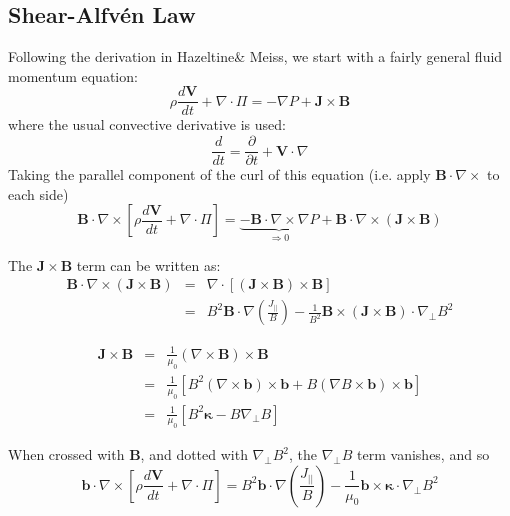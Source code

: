 \documentclass[12pt, a4paper]{article}
\newcommand{\deriv}[2]{\ensuremath{\frac{\partial #1}{\partial #2}}}
\newcommand{\Vec}[1]{\ensuremath{\mathbf{#1}}}
\newcommand{\Bvec}{\Vec{B}}
\newcommand{\Jvec}{\Vec{J}}
\newcommand{\Div}[1]{\ensuremath{\nabla\cdot #1 }}
\begin{document}
\subsection{Shear-Alfv\'en Law}

Following the derivation in Hazeltine\& Meiss, we start with a fairly general fluid momentum equation:
\begin{equation}
\rho\frac{d\Vec{V}}{dt} + \Div{\Pi} = -\nabla P + \Jvec\times\Bvec
\label{eq:genfluid}
\end{equation}
where the usual convective derivative is used:
\[
\frac{d}{dt} = \deriv{}{t} + \Vec{V}\cdot\nabla
\]
Taking the parallel component of the curl of this equation (i.e. apply $\Bvec\cdot\nabla\times$ to each side)
\[
\Bvec\cdot\nabla\times\left[\rho\frac{d\Vec{V}}{dt} + \Div{\Pi}\right] = \underbrace{-\Bvec\cdot\nabla\times\nabla P}_{\Rightarrow 0} + \Bvec\cdot\nabla\times\left(\Jvec\times\Bvec\right)
\]

The $\Jvec\times\Bvec$ term can be written as:
\begin{eqnarray}
\Bvec\cdot\nabla\times\left(\Jvec\times\Bvec\right) &=& \nabla\cdot\left[\left(\Jvec\times\Bvec\right)\times\Bvec\right] \nonumber \\
&=& B^2\Bvec\cdot\nabla\left(\frac{J_{||}}{B}\right) - \frac{1}{B^2}\Bvec\times\left(\Jvec\times\Bvec\right)\cdot\nabla_\perp B^2
\end{eqnarray}

\begin{eqnarray}
\Jvec\times\Bvec &=& \frac{1}{\mu_0}\left(\nabla\times\Bvec\right)\times\Bvec \nonumber \\
&=& \frac{1}{\mu_0}\left[B^2\left(\nabla\times\Vec{b}\right)\times\Vec{b} + B\left(\nabla B\times\Vec{b}\right)\times\Vec{b}\right] \nonumber \\
&=& \frac{1}{\mu_0}\left[B^2\Vec{\kappa} - B\nabla_\perp B\right]
\end{eqnarray}

When crossed with $\Bvec$, and dotted with $\nabla_\perp B^2$, the $\nabla_\perp B$ term vanishes, and so
\begin{equation}
\Vec{b}\cdot\nabla\times\left[\rho\frac{d\Vec{V}}{dt} + \Div{\Pi}\right] = B^2\Vec{b}\cdot\nabla\left(\frac{J_{||}}{B}\right) - \frac{1}{\mu_0}\Vec{b}\times\Vec{\kappa}\cdot\nabla_\perp B^2
\label{eq:sa1}
\end{equation}
\end{document}
